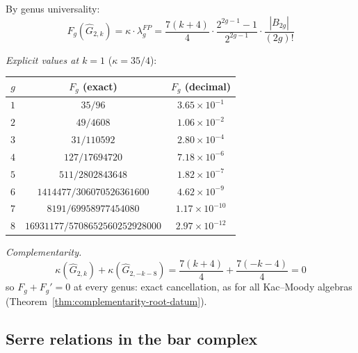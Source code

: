 \begin{computation}
\label{comp:G2-genus}
By genus universality:
\begin{equation}
F_g(\widehat{G}_{2,k}) = \kappa \cdot \lambda_g^{FP}
= \frac{7(k+4)}{4} \cdot
\frac{2^{2g-1}-1}{2^{2g-1}} \cdot \frac{|B_{2g}|}{(2g)!}
\end{equation}

\emph{Explicit values at $k = 1$} ($\kappa = 35/4$):
\begin{center}
\renewcommand{\arraystretch}{1.4}
\begin{tabular}{c|c|c}
$g$ & $F_g$ (exact) & $F_g$ (decimal) \\
\hline
$1$ & $35/96$ & $3.65 \times 10^{-1}$ \\
$2$ & $49/4608$ & $1.06 \times 10^{-2}$ \\
$3$ & $31/110592$ & $2.80 \times 10^{-4}$ \\
$4$ & $127/17694720$ & $7.18 \times 10^{-6}$ \\
$5$ & $511/2802843648$ & $1.82 \times 10^{-7}$ \\
$6$ & $1414477/306070526361600$ & $4.62 \times 10^{-9}$ \\
$7$ & $8191/69958977454080$ & $1.17 \times 10^{-10}$ \\
$8$ & $16931177/5708652560252928000$ & $2.97 \times 10^{-12}$
\end{tabular}
\end{center}

\emph{Complementarity.}
\begin{equation}
\kappa(\widehat{G}_{2,k}) + \kappa(\widehat{G}_{2,-k-8})
= \frac{7(k+4)}{4} + \frac{7(-k-4)}{4} = 0
\end{equation}
so $F_g + F_g' = 0$ at every genus: exact cancellation, as for all
Kac--Moody algebras
(Theorem~\ref{thm:complementarity-root-datum}).
\end{computation}

\subsection{Serre relations in the bar complex}

